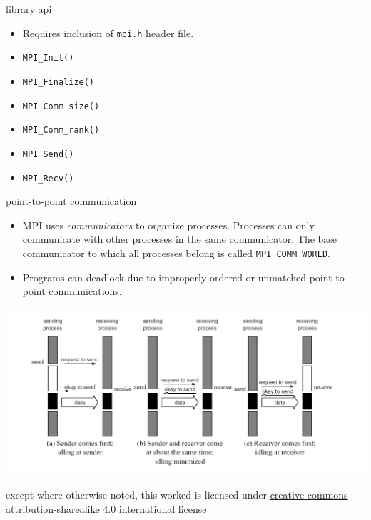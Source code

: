 \documentclass[10pt,t]{beamer}
\begin{document}
  \begin{frame}{library api}
    \begin{itemize}
      \item Requires inclusion of \texttt{mpi.h} header file.
    \end{itemize}

    \begin{itemize}
      \item \texttt{MPI\_Init()}
      \item \texttt{MPI\_Finalize()}
      \item \texttt{MPI\_Comm\_size()}
      \item \texttt{MPI\_Comm\_rank()}
      \item \texttt{MPI\_Send()}
      \item \texttt{MPI\_Recv()}
    \end{itemize}
  \end{frame}

  \begin{frame}{point-to-point communication}
    \begin{itemize}
      \item MPI uses \emph{communicators} to organize processes. Processes can
        only communicate with other processes in the same communicator. The base
        communicator to which all processes belong is called
        \texttt{MPI\_COMM\_WORLD}.

      \item Programs can deadlock due to improperly ordered or unmatched
        point-to-point communications.
    \end{itemize}

    \includegraphics[width=\textwidth]{blocking-comm.png}\\
  \end{frame}

  \appendix

  \begin{frame}[c]
    \begin{center}\ccbysa\end{center}

    except where otherwise noted, this worked is licensed under
    \href{http://creativecommons.org/licenses/by-sa/4.0/}{creative commons
    attribution-sharealike 4.0 international license}
  \end{frame}
\end{document}
